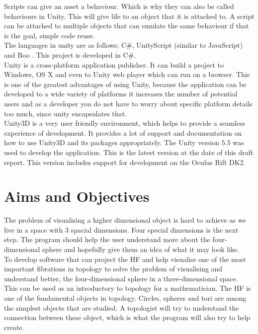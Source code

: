 \documentclass[12pt]{article} %
\begin{document}
\begin{flushleft}
Scripts can give an asset a behaviour. Which is why they can also be called behaviours in Unity. This will give life to an object that it is attached to. A script can be attached to multiple objects that can emulate the same behaviour if that is the goal, simple code reuse.\\
The languages in unity are as follows; C\#, UnityScript (similar to JavaScript) and Boo \cite{unity:scripting}. This project is developed in C\#. \\
Unity is a cross-platform application publisher. It can build a project to Windows, OS X and even to Unity web player which can run on a browser. This is one of the greatest advantages of using Unity, because the application can be developed to a wide variety of platforms it increases the number of potential users and as a developer you do not have to worry about specific platform details too much, since unity encapsulates that.  \\
Unity3D is a very user friendly environment, which helps to provide a seamless experience of development. It provides a lot of support and documentation on how to use Unity3D and its packages appropriately.
The Unity version 5.5 was used to develop the application. This is the latest version at the date of this draft report. This version includes support for development on the Oculus Rift DK2.\\

\section{Aims and Objectives}
The problem of visualising a higher dimensional object is hard to achieve as we live in a space with 3 spacial dimensions. Four special dimensions is the next step. The program should help the user understand more about the four-dimensional sphere and hopefully give them an idea of what it may look like. \\
To develop software that can project the HF and help visualise one of the most important fibrations in topology to solve the problem of visualising and understand better, the four-dimensional sphere in a three-dimensional space.\\
This can be used as an introductory to topology for a mathematician. The HF is one of the fundamental objects in topology. Circles, spheres and tori are among the simplest objects that are studied. A topologist will try to understand the connection between these object, which is what the program will also try to help create. \\

\end{flushleft}
\end{document}
